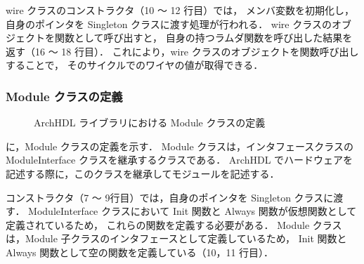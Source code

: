 wire クラスのコンストラクタ（10 ～ 12 行目）では，
メンバ変数を初期化し，自身のポインタを Singleton クラスに渡す処理が行われる．
wire クラスのオブジェクトを関数として呼び出すと，
自身の持つラムダ関数を呼び出した結果を返す（16 ～ 18 行目）．
これにより，wire クラスのオブジェクトを関数呼び出しすることで，
そのサイクルでのワイヤの値が取得できる．

\subsubsection{Module クラスの定義}

\begin{figure}[t]
 
 \caption{ArchHDL ライブラリにおける Module クラスの定義}
 \label{src:module}
\end{figure}

 に，Module クラスの定義を示す．
Module クラスは，インタフェースクラスの ModuleInterface クラスを継承するクラスである．
ArchHDL でハードウェアを記述する際に，このクラスを継承してモジュールを記述する．

コンストラクタ（7 ～ 9行目）では，自身のポインタを Singleton クラスに渡す．
ModuleInterface クラスにおいて Init 関数と Always 関数が仮想関数として定義されているため，
これらの関数を定義する必要がある．
Module クラスは，Module 子クラスのインタフェースとして定義しているため，
Init 関数と Always 関数として空の関数を定義している（10，11 行目）．
